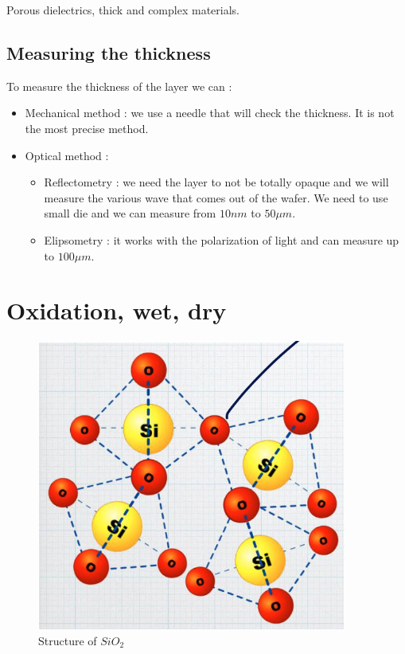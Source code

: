 \documentclass{report}
\begin{document}
Porous dielectrics, thick and complex materials.

\section{Measuring the thickness}

To measure the thickness of the layer we can :

\begin{itemize}
    \item Mechanical method : we use a needle that will check the thickness. It is not the most precise method.
    \item Optical method : 
    \begin{itemize}
        \item Reflectometry : we need the layer to not be totally opaque and we will measure the various wave that comes out of the wafer. We need to use small die and we can measure from $10nm$ to $50\mu m$.
        \item Elipsometry : it works with the polarization of light and can measure up to $100\mu m$.
    \end{itemize}
\end{itemize}

\chapter{Oxidation, wet, dry}

\begin{figure}
    \centering
    \includegraphics[width=0.95\linewidth]{sio2_structure.png}
    \caption{Structure of $SiO_2$}
    \label{fig:sio2-structure-label}
\end{figure}
\end{document}
